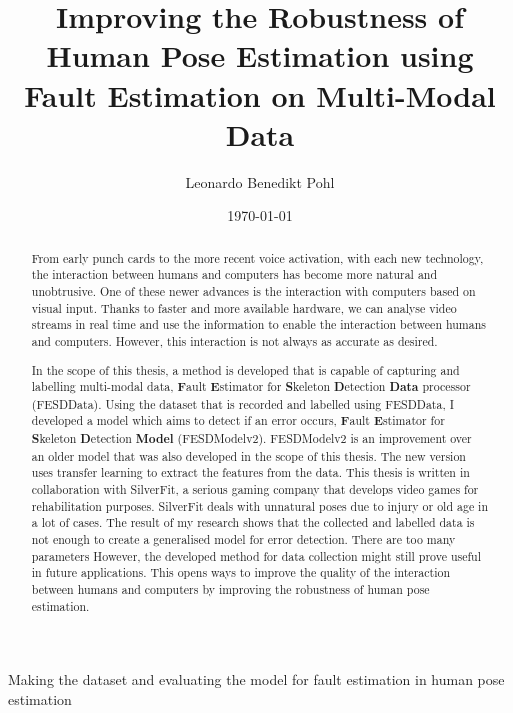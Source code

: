 
\title{Improving the Robustness of Human Pose Estimation using Fault Estimation on Multi-Modal Data}
\author{Leonardo Benedikt Pohl}
Making the dataset and evaluating the model for fault estimation in human pose estimation

\date{\today}


% 


\clearpage

\begin{abstract}
    
  From early punch cards to the more recent voice activation, with each new technology, the interaction between humans and computers has become more natural and unobtrusive. One of these newer advances is the interaction with computers based on visual input. Thanks to faster and more available hardware, we can analyse video streams in real time and use the information to enable the interaction between humans and computers. However, this interaction is not always as accurate as desired.

  In the scope of this thesis, a method is developed that is capable of capturing and labelling multi-modal data, \textbf{F}ault \textbf{E}stimator for \textbf{S}keleton \textbf{D}etection \textbf{Data} processor (FESDData). Using the dataset that is recorded and labelled using FESDData, I developed a model which aims to detect if an error occurs, \textbf{F}ault \textbf{E}stimator for \textbf{S}keleton \textbf{D}etection \textbf{Model} (FESDModelv2). FESDModelv2 is an improvement over an older model that was also developed in the scope of this thesis. The new version uses transfer learning to extract the features from the data. This thesis is written in collaboration with SilverFit, a serious gaming company that develops video games for rehabilitation purposes. SilverFit deals with unnatural poses due to injury or old age in a lot of cases. 
  The result of my research shows that the collected and labelled data is not enough to create a generalised model for error detection. There are too many parameters  However, the developed method for data collection might still prove useful in future applications. This opens ways to improve the quality of the interaction between humans and computers by improving the robustness of human pose estimation.
   
\end{abstract}
